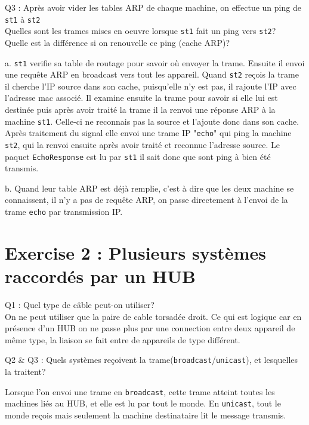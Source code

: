 \documentclass[11pt, openright]{book}
\begin{document}
\begin{dent}{Q3 :} Après avoir vider les tables ARP de chaque machine, on effectue un ping de \texttt{st1} à \texttt{st2}\\
	Quelles sont les trames mises en oeuvre lorsque \texttt{st1} fait un ping vers \texttt{st2}?\\
	Quelle est la différence si on renouvelle ce ping (cache ARP)?
	
	\begin{enum}{-15pt}{-15pt}
		\item[a.] \texttt{st1} verifie sa table de routage pour savoir où envoyer la trame. Ensuite il envoi une requête ARP en broadcast vers tout les appareil. Quand \texttt{st2} reçois la trame il cherche l'IP source dans son cache, puisqu'elle n'y est pas, il rajoute l'IP avec l'adresse mac associé. Il examine ensuite la trame pour savoir si elle lui est destinée puis après avoir traité la trame il la renvoi une réponse ARP à la machine \texttt{st1}. Celle-ci ne reconnais pas la source et l'ajoute donc dans son cache. Après traitement du signal elle envoi une trame IP "\texttt{echo}" qui ping la machine \texttt{st2}, qui la renvoi ensuite après avoir traité et reconnue l'adresse source. Le paquet \texttt{EchoResponse} est lu par \texttt{st1} il sait donc que sont ping à bien été transmis. 
		\item[b.] Quand leur table ARP est déjà remplie, c'est à dire que les deux machine se connaissent, il n'y a pas de requête ARP, on passe directement à l'envoi de la trame \texttt{echo} par transmission IP.
	\end{enum}
\end{dent}

\section{Exercise 2 : Plusieurs systèmes raccordés par un HUB}

\begin{dent}{Q1 :} Quel type de câble peut-on utiliser?\\
	On ne peut utiliser que la paire de cable torsadée droit. Ce qui est logique car en présence d'un HUB on ne passe plus par une connection entre deux appareil de même type, la liaison se fait entre de appareils de type différent. 
\end{dent}

\begin{dent}{Q2 \& Q3 :} Quels systèmes reçoivent la trame(\texttt{broadcast}/\texttt{unicast}), et lesquelles la traitent?
	
	Lorsque l'on envoi une trame en \texttt{broadcast}, cette trame atteint toutes les machines liés au HUB, et elle est lu par tout le monde. En \texttt{unicast}, tout le monde reçois mais seulement la machine destinataire lit le message transmis.     
\end{dent}
\end{document}
